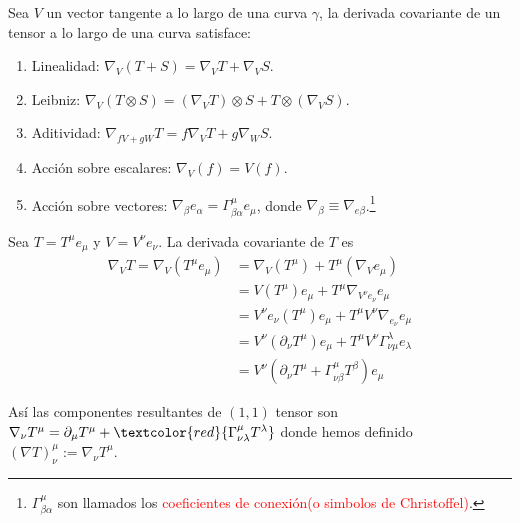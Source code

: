 \documentclass[../main]{subfiles}
\begin{document}
\begin{adjustwidth}{0pt}{-100pt}
Sea $V$ un vector tangente a lo largo de una curva $\gamma$, la derivada covariante de un tensor a lo largo de una curva satisface:
\begin{enumerate}
    \item Linealidad: $\nabla_{V}(T+S)=\nabla_{V} T+\nabla_{V} S$.
    \item Leibniz: $\nabla_{V}(T\otimes S)=(\nabla_{V}T)\otimes S+T\otimes(\nabla_{V} S)$.
    \item Aditividad: $\nabla_{fV+gW} T=f\nabla_{V}T+g\nabla_{W}S$.
    \item Acción sobre escalares: $\nabla_V(f)=V(f)$.
    \item Acción sobre vectores: $\nabla_{\beta}e_{\alpha}=\Gamma^{\mu}_{\beta\alpha} e_{\mu}$, donde $\nabla_{\beta} \equiv \nabla_{e\beta}$.\footnote{$\Gamma^{\mu}_{\beta\alpha}$ son llamados los \textcolor{red}{coeficientes de conexión(o simbolos de Christoffel)}.}
\end{enumerate}

Sea $T=T^{\mu}e_{\mu}$ y $V=V^{\nu} e_{\nu}$. La derivada covariante de $T$ es 
\begin{equation}
    \begin{aligned}
        \nabla_V T=\nabla_V (T^{\mu}e_{\mu})&=\nabla_V (T^{\mu})+T^{\mu}(\nabla_V e_{\mu})\\
        &=V(T^{\mu})e_{\mu}+T^{\mu}\nabla_{V^{\nu}e_{\nu}}e_{\mu}\\
        &=V^{\nu}e_{\nu}(T^{\mu})e_{\mu}+T^{\mu}V^{\nu}\nabla_{e_{\nu}}e_{\mu}\\
        &=V^{\nu}(\partial_{\nu}T^{\mu})e_{\mu}+T^{\mu}V^{\nu}\Gamma^{\lambda}_{\nu\mu}e_{\lambda}\\
        &=V^{\nu}(\partial_{\nu}T^{\mu}+\Gamma^{\mu}_{\nu\beta}T^{\beta})e_{\mu}
    \end{aligned}
\end{equation}

Así las componentes resultantes de $(1, 1)$ tensor son $\nabla_{\nu} T^{\mu}=\partial_{\mu} T^{\mu}+\textcolor{red}{\Gamma^{\mu}_{\nu\lambda} T^{\lambda}}$ donde hemos definido $(\nabla T)^{\mu}_{\nu}:=\nabla_{\nu} T^{\mu}$.


\end{adjustwidth}
\end{document}

